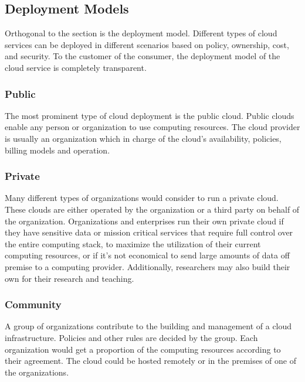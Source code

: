\documentclass[12pt]{article}
\begin{document}


\subsection{Deployment Models} \label{sub:deployment-model}

Orthogonal to the  section is the deployment model. Different types of cloud services can be deployed in different scenarios based on policy, ownership, cost, and security. To the customer of the consumer, the deployment model of the cloud service is completely transparent.

\subsubsection{Public} \label{ssub:deploy-public}

The most prominent type of cloud deployment is the public cloud. Public clouds enable any person or organization to use computing resources. The cloud provider is usually an organization which in charge of the cloud's availability, policies, billing models and operation.


\subsubsection{Private} \label{ssub:deploy-private}

Many different types of organizations would consider to run a private cloud. These clouds are either operated by the organization or a third party on behalf of the organization. Organizations and enterprises run their own private cloud if they have sensitive data or mission critical services that require full control over the entire computing stack, to maximize the utilization of their current computing resources, or if it's not economical to send large amounts of data off premise to a computing provider. Additionally, researchers may also build their own for their research and teaching.


\subsubsection{Community} \label{ssub:deploy-community}

A group of organizations contribute to the building and management of a cloud infrastructure. Policies and other rules are decided by the group. Each organization would get a proportion of the computing resources according to their agreement. The cloud could be hosted remotely or in the premises of one of the organizations.
\end{document}
